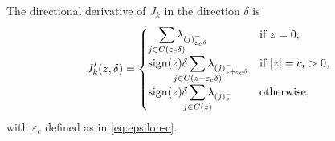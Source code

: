 \begin{theorem}\label{thm:sl1-directional-derivative}
  The directional derivative of \(J_k\) in the direction \(\delta\) is
  \[
    J'_k(z, \delta) =
    \begin{cases}
      \smashoperator[r]{\sum_{j \in C({\varepsilon_c} \delta)}} \lambda_{(j)^-_{{\varepsilon_c}\delta}}                    & \text{if } z = 0,         \\
      \sign(z)\delta\smashoperator{\sum_{j \in C(z + {\varepsilon_c} \delta)}} \lambda_{(j)^-_{z + {\varepsilon_c}\delta}} & \text{if } |z| = c_i > 0, \\
      \sign(z)\delta\smashoperator{\sum_{j \in C(z)}} \lambda_{(j)^-_{z}}                                                  & \text{otherwise,}
    \end{cases}
  \]
  with \({\varepsilon_c}\) defined as in \eqref{eq:epsilon-c}.
\end{theorem}
